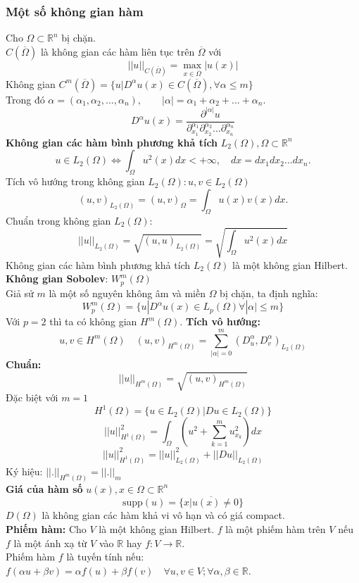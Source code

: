 \documentclass[
12pt, %
oneside, %
english, %
onehalfspacing, %
nolistspacing, %
headsepline, %
addchap,
]{MastersDoctoralThesis} %
\begin{document}
\subsubsection*{Một số không gian hàm}
Cho $\Omega \subset\mathbb{R}^n$ bị chặn.\\
$C(\overline{\Omega})$ là không gian các hàm liên tục trên $\overline{\Omega}$ với
$$||u||_{C(\overline{\Omega})}=\max_{x\in \overline{\Omega}}|u(x)|$$
Không gian $C^m(\overline{\Omega}) = \{u|D^\alpha u(x)\in C(\overline{\Omega}), \forall \alpha \leq m\}$\\
Trong đó $\alpha =(\alpha_1,\alpha_2,...,\alpha_n), \qquad |\alpha| = \alpha_1 + \alpha_2 + ... + \alpha_n.$
$$D^\alpha u(x)=\frac{\partial^{|\alpha|}u}{\partial^{\alpha_1}_{x_1}\partial^{\alpha_2}_{x_2}...\partial^{\alpha_n}_{x_n}}$$
\textbf{Không gian các hàm bình phương khả tích} $L_2(\Omega),\Omega \subset \mathbb{R}^n$
$$u \in L_2(\Omega)\Leftrightarrow\int_\Omega u^2(x)dx< +\infty ,\quad dx = dx_1dx_2...dx_n.$$
Tích vô hướng trong không gian $L_2(\Omega): u,v \in L_2(\Omega)$
$$(u,v)_{L_2(\Omega)}=(u,v)_\Omega=\int_\Omega u(x)v(x)dx.$$
Chuẩn trong không gian $L_2(\Omega)$:
$$||u||_{L_2(\Omega)}=\sqrt{(u,u)_{L_2(\Omega)}}=\sqrt{\int_\Omega u^2(x)dx}$$
Không gian các hàm bình phương khả tích $L_2(\Omega)$ là một không gian Hilbert.\\
\textbf{Không gian Sobolev}: $W^m_p(\Omega)$\\
Giả sử $m$ là một số nguyên không âm và miền $\Omega$ bị chặn, ta định nghĩa:
$$W^m_p(\Omega)=\{u|D^\alpha u(x)\in L_p(\Omega)\forall |\alpha|\leq m\}$$
Với $p=2$ thì ta có không gian $H^m(\Omega)$.
\textbf{Tích vô hướng:}
$$u,v\in H^m(\Omega)\quad (u,v)_{H^m(\Omega)}=\sum_{|\alpha|=0}^m(D^\alpha_u,D^\alpha_v)_{L_2(\Omega)}$$
\textbf{Chuẩn:}
$$||u||_{H^m(\Omega)}=\sqrt{(u,v)_{H^m(\Omega)}}$$
Đặc biệt với $m=1$
$$H^1(\Omega)=\{u\in L_2(\Omega)|Du\in L_2(\Omega)\}$$
$$||u||^2_{H^1(\Omega)}=\int_\Omega (u^2+\sum_{k=1}^mu^2_{x_k})dx$$
$$||u||^2_{H^1(\Omega)}=||u||^2_{L_2(\Omega)}+||Du||_{L_2(\Omega)}$$
Ký hiệu: $||.||_{H^m(\Omega)}=||.||_m$\\
\textbf{Giá của hàm số} $u(x), x\in\Omega\subset\mathbb{R}^n$
$$\text{supp}(u)=\overline{\{x|u(x)\neq 0\}}$$
$D(\Omega)$ là không gian các hàm khả vi vô hạn và có giá compact.\\
\textbf{Phiếm hàm:} Cho $V$ là một không gian Hilbert. $f$ là một phiếm hàm trên $V$ nếu $f$ là một ánh xạ từ $V$ vào $\mathbb{R}$ hay $f:V\rightarrow\mathbb{R}$.\\
Phiếm hàm $f$ là tuyến tính nếu: $f(\alpha u+\beta v)=\alpha f(u)+\beta f(v) \quad \forall u,v\in V;\forall \alpha,\beta \in \mathbb{R}$.\\
\end{document}
